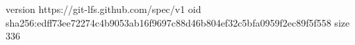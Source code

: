 version https://git-lfs.github.com/spec/v1
oid sha256:edff73ee72274c4b9053ab16f9697c88d46b804ef32c5bfa0959f2ec89f5f558
size 336
